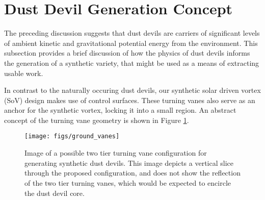%
%
%
%
%
%
%
%
%

\section{Dust Devil Generation Concept}

The preceding discussion suggests that dust devils are carriers of
significant levels of ambient kinetic and gravitational potential energy
from the environment. This subsection provides a brief discussion of how
the physics of dust devils informs the generation of a synthetic
variety, that might be used as a means of extracting usable work.  

In contrast to the naturally occuring dust devils,
our synthetic solar driven vortex (SoV) design makes use of
control surfaces. These turning vanes also serve as an anchor for the
synthetic vortex, locking it into a small region. An abstract concept of
the turning vane geometry is shown in Figure \ref{fig:cartoon_vanes}.

  \begin{figure}[!htb]
    \begin{center}
     \texttt{[image: figs/ground\_vanes]}
     \caption{Image of a possible two tier turning vane 
       configuration for generating synthetic dust devils. This image depicts a 
       vertical slice through the proposed configuration, and does not show the reflection 
       of the two tier turning vanes, which would be expected to encircle the dust devil core.}
     \label{fig:cartoon_vanes}
    \end{center}
  \end{figure}


